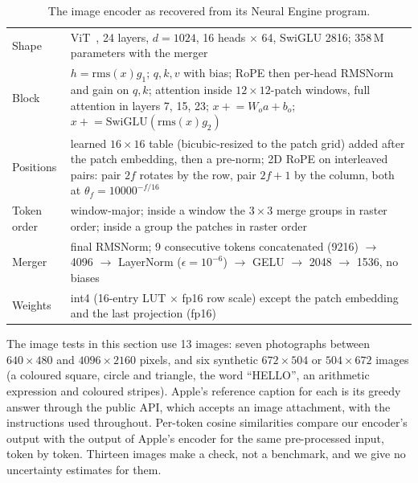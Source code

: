 \documentclass[11pt,reqno]{amsart}
\makeatletter
\renewcommand\paragraph{\@startsection{paragraph}{4}\z@{.6\linespacing\@plus.2\linespacing}{-\fontdimen2\font}{\normalfont\bfseries}}
\theoremstyle{definition}
\makeatother
\begin{document}
\begin{table}[H]
\centering\small
\begin{tabular}{@{}p{30mm}p{128mm}@{}}
\toprule
Shape & ViT~\cite{dosovitskiy2020vit}, 24 layers, $d=1024$, 16 heads $\times$ 64, SwiGLU 2816; 358\,M parameters with the merger \\
Block & $h=\mathrm{rms}(x)g_1$; $q,k,v$ with bias; RoPE then per-head RMSNorm and gain on $q,k$; attention inside $12\times12$-patch windows, full attention in layers 7, 15, 23; $x \mathrel{+}= W_o a + b_o$; $x \mathrel{+}= \mathrm{SwiGLU}(\mathrm{rms}(x)g_2)$ \\
Positions & learned $16\times16$ table (bicubic-resized to the patch grid) added after the patch embedding, then a pre-norm; 2D RoPE on interleaved pairs: pair $2f$ rotates by the row, pair $2f{+}1$ by the column, both at $\theta_f=10000^{-f/16}$ \\
Token order & window-major; inside a window the $3\times3$ merge groups in raster order; inside a group the patches in raster order \\
Merger & final RMSNorm; 9 consecutive tokens concatenated (9216) $\to$ 4096 $\to$ LayerNorm ($\epsilon=10^{-6}$) $\to$ GELU $\to$ 2048 $\to$ 1536, no biases \\
Weights & int4 (16-entry LUT $\times$ fp16 row scale) except the patch embedding and the last projection (fp16) \\
\bottomrule
\end{tabular}
\caption{The image encoder as recovered from its Neural Engine program.}
\label{tab:vision}
\end{table}

\paragraph{Evaluation data.} The image tests in this section use 13 images: seven photographs between $640\times480$ and $4096\times2160$ pixels, and six synthetic $672\times504$ or $504\times672$ images (a coloured square, circle and triangle, the word ``HELLO'', an arithmetic expression and coloured stripes). Apple's reference caption for each is its greedy answer through the public API, which accepts an image attachment, with the instructions used throughout. Per-token cosine similarities compare our encoder's output with the output of Apple's encoder for the same pre-processed input, token by token. Thirteen images make a check, not a benchmark, and we give no uncertainty estimates for them.
\end{document}
